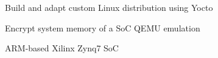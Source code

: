 \begin{tightemize}
    \item Build and adapt custom Linux distribution using Yocto
    \item Encrypt system memory of a SoC QEMU emulation
    \item ARM-based Xilinx Zynq7 SoC
\end{tightemize}